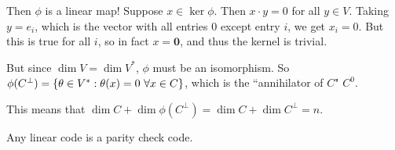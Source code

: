 \documentclass{article}
\begin{document}
Then $\phi$ is a linear map!
Suppose $x \in \ker \phi$. Then $x \cdot y = 0$ for all $y \in V$.
Taking $y = e_i$, which is the vector with all entries 0 except entry $i$,
we get $x_i = 0$. But this is true for all $i$, so in fact $x = \textbf{0}$,
and thus the kernel is trivial.

But since $\dim V = \dim V^*$, $\phi$ must be an isomorphism.
So $\phi(C^\bot) = \left\lbrace \theta \in V^* : \theta(x) = 0 \ \forall x \in C \right\rbrace$,
which is the ``annihilator of $C$" $C^0$.

This means that
$\dim C + \dim \phi(C^\bot) = \dim C + \dim C^\bot = n$.

\begin{corollary}
    Any linear code is a parity check code.
\end{corollary}
\end{document}
